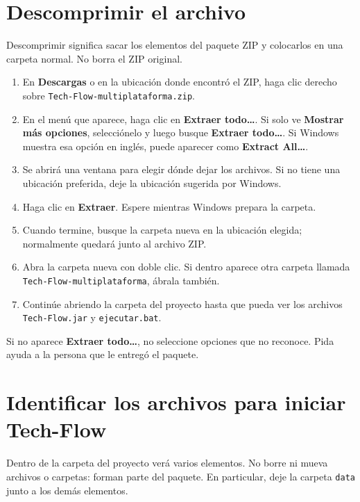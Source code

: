 \documentclass[12pt,a4paper]{article}
\begin{document}
\section{Descomprimir el archivo}
Descomprimir significa sacar los elementos del paquete ZIP y colocarlos en una carpeta normal. No borra el ZIP original.
\begin{enumerate}
\item En \textbf{Descargas} o en la ubicación donde encontró el ZIP, haga clic derecho sobre \texttt{Tech-Flow-multiplataforma.zip}.
\item En el menú que aparece, haga clic en \textbf{Extraer todo\ldots}. Si solo ve \textbf{Mostrar más opciones}, selecciónelo y luego busque \textbf{Extraer todo\ldots}. Si Windows muestra esa opción en inglés, puede aparecer como \textbf{Extract All\ldots}.
\item Se abrirá una ventana para elegir dónde dejar los archivos. Si no tiene una ubicación preferida, deje la ubicación sugerida por Windows.
\item Haga clic en \textbf{Extraer}. Espere mientras Windows prepara la carpeta.
\item Cuando termine, busque la carpeta nueva en la ubicación elegida; normalmente quedará junto al archivo ZIP.
\item Abra la carpeta nueva con doble clic. Si dentro aparece otra carpeta llamada \texttt{Tech-Flow-multiplataforma}, ábrala también.
\item Continúe abriendo la carpeta del proyecto hasta que pueda ver los archivos \texttt{Tech-Flow.jar} y \texttt{ejecutar.bat}.
\end{enumerate}
Si no aparece \textbf{Extraer todo\ldots}, no seleccione opciones que no reconoce. Pida ayuda a la persona que le entregó el paquete.

\section{Identificar los archivos para iniciar Tech-Flow}
Dentro de la carpeta del proyecto verá varios elementos. No borre ni mueva archivos o carpetas: forman parte del paquete. En particular, deje la carpeta \texttt{data} junto a los demás elementos.
\end{document}
